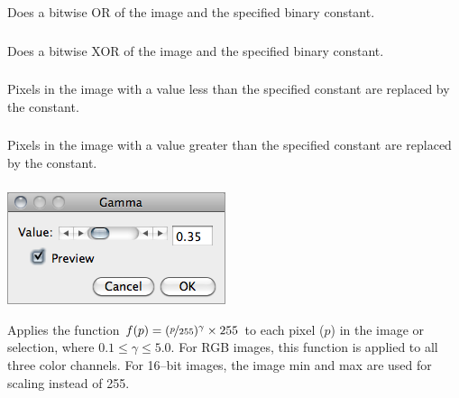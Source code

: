 Does a bitwise OR of the image and the
specified binary constant. 


\subsubsection{\protect{}}

Does a bitwise XOR of the image and the
specified binary constant. 


\subsubsection{\protect{}}

Pixels in the image with a value less than the specified constant
are replaced by the constant.


\subsubsection{\protect{}\label{sub:Max...}}

Pixels in the image with a value greater than the specified constant
are replaced by the constant.


\subsubsection{\protect{}\label{sub:Gamma...}}

\begin{minipage}[c][1\totalheight][t]{0.35\columnwidth}%
\includegraphics[scale=0.55]{images/Gamma}%
\end{minipage}%
\begin{minipage}[c][1\totalheight][t]{0.65\columnwidth}%
Applies the function $f(p)=(\nicefrac{p}{255}){}^{\gamma}\times255$
to each pixel ($p$) in the image or selection, where $0.1\leq\gamma\leq5.0$.
For RGB images, this function is applied to all three color channels.
For 16--bit images, the image min and max are used for scaling instead
of 255. 


%
\end{minipage}


